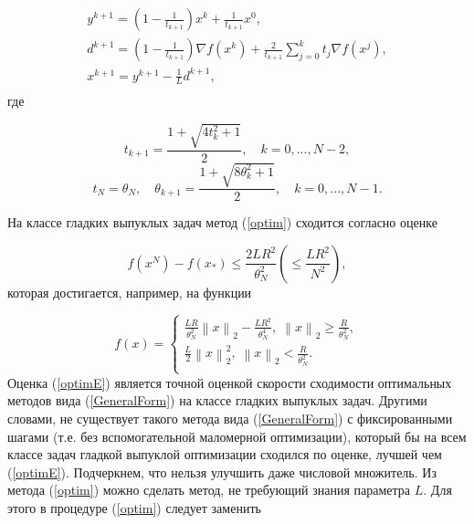     \begin{equation}
    \label{optim}
    \begin{array}{c}
     y^{k+1}=\left( {1-\frac{1}{t_{k+1} }} \right)x^k+\frac{1}{t_{k+1} }x^0, \\ 
     d^{k+1}=\left( {1-\frac{1}{t_{k+1} }} \right)\nabla f\left( {x^k} 
    \right)+\frac{2}{t_{k+1} }\sum_{j=0}^k {t_j \nabla f\left( {x^j} 
    \right)} , \\ 
     x^{k+1}=y^{k+1}-\frac{1}{L}d^{k+1}, \\ 
     \end{array}
    \end{equation}
    где

    \[
    t_{k+1} =\frac{1+\sqrt {4t_k^2 +1} }{2},
    \quad
    k=0,...,N-2,
    \]
    \[
    t_N =\theta _N ,
    \quad
    \theta _{k+1} =\frac{1+\sqrt {8\theta _k^2 +1} }{2},
    \quad
    k=0,...,N-1.
    \]

    На классе гладких выпуклых задач метод (\ref{optim}) сходится согласно оценке 

    \begin{equation}
    \label{optimE}
    f\left( {x^N} \right)-f\left( {x_\ast } \right)\le \frac{2LR^2}{\theta _N^2 
    }\left( {\le \frac{LR^2}{N^2}} \right),
    \end{equation}
    которая достигается, например, на функции

    \begin{equation}
    \label{Example}
    f\left( x \right)=\left\{ {\begin{array}{l}
     \frac{LR}{\theta _N^2 }\left\| x \right\|_2 -\frac{LR^2}{\theta _N^4 
    },\;\left\| x \right\|_2 \ge \frac{R}{\theta _N^2 }, \\ 
     \frac{L}{2}\left\| x \right\|_2^2 ,\;\left\| x \right\|_2 <\frac{R}{\theta 
    _N^2 }. \\ 
     \end{array}} \right.
    \end{equation}
    Оценка (\ref{optimE}) является точной оценкой скорости сходимости оптимальных методов вида (\ref{GeneralForm}) на классе гладких выпуклых задач. Другими словами, не существует такого метода вида (\ref{GeneralForm}) с фиксированными шагами (т.е. без вспомогательной маломерной оптимизации), который бы на всем классе задач гладкой выпуклой оптимизации сходился по оценке, лучшей чем (\ref{optimE}). Подчеркнем, что нельзя улучшить даже числовой множитель. Из метода (\ref{optim}) можно сделать метод, не требующий знания параметра $L$. Для этого в процедуре (\ref{optim}) следует заменить

